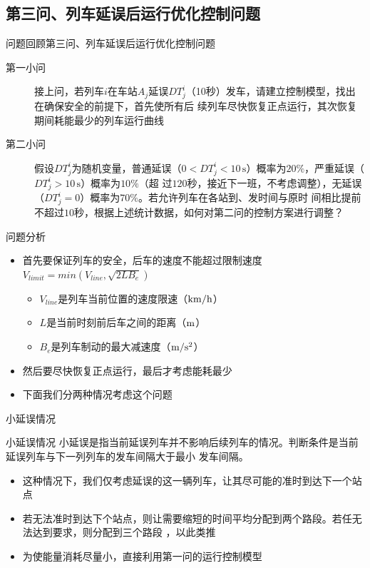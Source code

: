\documentclass{beamer}
\begin{document}
\subsection{第三问、列车延误后运行优化控制问题}
\begin{frame}{问题回顾}{第三问、列车延误后运行优化控制问题}
\begin{description}
  \item[第一小问] 接上问，若列车$i$在车站$A_j$延误$DT_j^i$（10秒）发车，请建立控制模型，找出在确保安全的前提下，首先使所有后
续列车尽快恢复正点运行，其次恢复期间耗能最少的列车运行曲线
  \item[第二小问] 假设$DT_j^i$为随机变量，普通延误（$0<DT_j^i <10 \, \mathrm{s}$）概率为$20\%$，严重延误（$DT_j^i >10 \, \mathrm{s}$）概率为$10\%$（超
过$120$秒，接近下一班，不考虑调整），无延误（$DT_j^i= 0$）概率为$70\%$。若允许列车在各站到、发时间与原时
间相比提前不超过$10$秒，根据上述统计数据，如何对第二问的控制方案进行调整？
\end{description}
\end{frame}

\begin{frame}{问题分析}
\begin{itemize}
  \item<1-> 首先要保证列车的安全，后车的速度不能超过限制速度$V_{limit} = min(V_{line}, \sqrt{2LB_e})$
  \begin{itemize}
    \item<2-> $V_{line}$是列车当前位置的速度限速（$ \rm km/h$）
    \item<3-> $L$是当前时刻前后车之间的距离（$\rm m$）
    \item<4-> $B_e$是列车制动的最大减速度（$\rm m/s^2$）
  \end{itemize}
  \item<5-> 然后要尽快恢复正点运行，最后才考虑能耗最少
  \item<6-> 下面我们分两种情况考虑这个问题
\end{itemize}
\end{frame}

\begin{frame}{小延误情况}
\begin{block}{小延误情况}
小延误是指当前延误列车并不影响后续列车的情况。判断条件是当前延误列车与下一列列车的发车间隔大于最小
发车间隔。
\end{block}
\begin{itemize}
  \item<1-> 这种情况下，我们仅考虑延误的这一辆列车，让其尽可能的准时到达下一个站点
  \item<2-> 若无法准时到达下个站点，则让需要缩短的时间平均分配到两个路段。若任无法达到要求，则分配到三个路段
  ，以此类推
  \item<3-> 为使能量消耗尽量小，直接利用第一问的运行控制模型
\end{itemize}
\end{frame}
\end{document}
